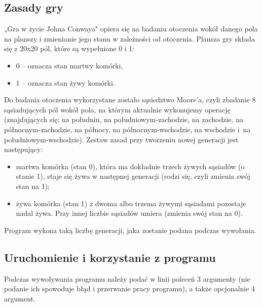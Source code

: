 \documentclass[12pt]{report}
\begin{document}
\subsection{Zasady gry}
„Gra w życie Johna Conwaya" opiera się na badaniu otoczenia wokół danego pola na planszy i zmienianie jego stanu w zależności od otoczenia. Plansza gry składa się z 20x20 pól, które są wypełnione 0 i 1:
\begin{itemize}
  \item 0 – oznacza stan martwy komórki,
  \item 1 – oznacza stan żywy komórki.
\end{itemize}
Do badania otoczenia wykorzystane zostało sąsiedztwo Moore'a, czyli zbadanie 8 sąsiadujących pól wokół pola, na którym aktualnie wykonujemy operację (znajdujących się: na południu, na południowym-zachodzie, na zachodzie, na północnym-zachodzie, na północy, na północnym-wschodzie, na wschodzie i~na południowym-wschodzie).
Zestaw zasad przy tworzeniu nowej generacji jest następujący:

\begin{itemize}
  \item martwa komórka (stan 0), która ma dokładnie trzech żywych sąsiadów (o stanie 1), staje się żywa w następnej generacji (rodzi się, czyli zmienia swój stan na 1);
  \item żywa komórka (stan 1) z dwoma albo trzema żywymi sąsiadami pozostaje nadal żywa. Przy innej liczbie sąsiadów umiera (zmienia swój stan na 0).
\end{itemize}

Program wykona taką liczbę generacji, jaka zostanie podana podczas wywołania.

\subsection{Uruchomienie i korzystanie z programu}
Podczas wywoływania programu należy podać w linii poleceń 3 argumenty (nie podanie ich spowoduje błąd i przerwanie pracy programu), a także opcjonalnie 4 argument.
\end{document}
